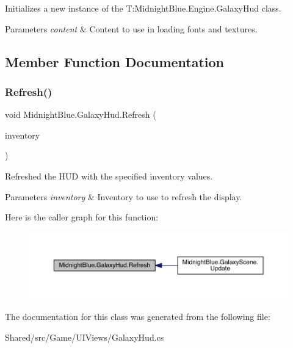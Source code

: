 Initializes a new instance of the T\+:\+Midnight\+Blue.\+Engine.\+Galaxy\+Hud class. 


\begin{DoxyParams}{Parameters}
{\em content} & Content to use in loading fonts and textures.\\
\hline
\end{DoxyParams}


\subsection{Member Function Documentation}
\hypertarget{class_midnight_blue_1_1_galaxy_hud_aea2d04b212188a2e729ea327b7da0449}{}\label{class_midnight_blue_1_1_galaxy_hud_aea2d04b212188a2e729ea327b7da0449} 
\subsubsection{\texorpdfstring{Refresh()}{Refresh()}}
{\footnotesize\ttfamily void Midnight\+Blue.\+Galaxy\+Hud.\+Refresh (\begin{DoxyParamCaption}\item[{Inventory}]{inventory }\end{DoxyParamCaption})\hspace{0.3cm}{\ttfamily [inline]}}



Refreshed the H\+UD with the specified inventory values. 


\begin{DoxyParams}{Parameters}
{\em inventory} & Inventory to use to refresh the display.\\
\hline
\end{DoxyParams}
Here is the caller graph for this function\+:
\nopagebreak
\begin{figure}[H]
\begin{center}
\leavevmode
\includegraphics[width=350pt]{class_midnight_blue_1_1_galaxy_hud_aea2d04b212188a2e729ea327b7da0449_icgraph}
\end{center}
\end{figure}


The documentation for this class was generated from the following file\+:\begin{DoxyCompactItemize}
\item 
Shared/src/\+Game/\+U\+I\+Views/Galaxy\+Hud.\+cs\end{DoxyCompactItemize}
